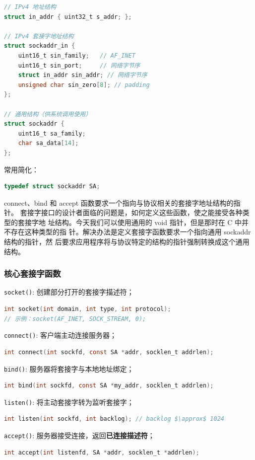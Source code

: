 \begin{lstlisting}[language=C]
// IPv4 地址结构
struct in_addr { uint32_t s_addr; };

// IPv4 套接字地址结构
struct sockaddr_in {
    uint16_t sin_family;   // AF_INET
    uint16_t sin_port;     // 网络字节序
    struct in_addr sin_addr; // 网络字节序
    unsigned char sin_zero[8]; // padding
};

// 通用结构（供系统调用使用）
struct sockaddr {
    uint16_t sa_family;
    char sa_data[14];
};
\end{lstlisting}
常用简化：
\begin{lstlisting}[language=C]
typedef struct sockaddr SA;
\end{lstlisting}

connect、bind 和 accept 函数要求一个指向与协议相关的套接字地址结构的指针。
套接字接口的设计者面临的问题是，如何定义这些函数，使之能接受各种类型的套接字地
址结构。今天我们可以使用通用的 void 指针，但是那时在 C 中并不存在这种类型的指
针。解决办法是定义套接字函数要求一个指向通用 sockaddr 结构的指针，然
后要求应用程序将与协议特定的结构的指针强制转换成这个通用结构。

\subsubsection{核心套接字函数}

\texttt{socket()}: 创建部分打开的套接字描述符；
\begin{lstlisting}[language=C]
int socket(int domain, int type, int protocol);
// 示例：socket(AF_INET, SOCK_STREAM, 0);
\end{lstlisting}

\texttt{connect()}: 客户端主动连接服务器；
\begin{lstlisting}[language=C]
int connect(int sockfd, const SA *addr, socklen_t addrlen);
\end{lstlisting}

\texttt{bind()}: 服务器将套接字与本地地址绑定；
\begin{lstlisting}[language=C]
int bind(int sockfd, const SA *my_addr, socklen_t addrlen);
\end{lstlisting}

\texttt{listen()}: 将主动套接字转为监听套接字；
\begin{lstlisting}[language=C]
int listen(int sockfd, int backlog); // backlog $\approx$ 1024
\end{lstlisting}

\texttt{accept()}: 服务器接受连接，返回\textbf{已连接描述符}；
\begin{lstlisting}[language=C]
int accept(int listenfd, SA *addr, socklen_t *addrlen);
\end{lstlisting}

